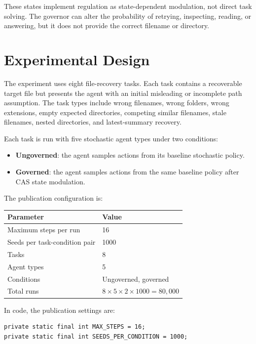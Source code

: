 \documentclass[11pt]{article}
\begin{document}
These states implement regulation as state-dependent modulation, not direct task solving. The governor can alter the probability of retrying, inspecting, reading, or answering, but it does not provide the correct filename or directory.

\section{Experimental Design}

The experiment uses eight file-recovery tasks. Each task contains a recoverable target file but presents the agent with an initial misleading or incomplete path assumption. The task types include wrong filenames, wrong folders, wrong extensions, empty expected directories, competing similar filenames, stale filenames, nested directories, and latest-summary recovery.

Each task is run with five stochastic agent types under two conditions:

\begin{itemize}[leftmargin=1.5em]
    \item \textbf{Ungoverned}: the agent samples actions from its baseline stochastic policy.
    \item \textbf{Governed}: the agent samples actions from the same baseline policy after CAS state modulation.
\end{itemize}

The publication configuration is:

\begin{center}
\begin{tabular}{ll}
\toprule
\textbf{Parameter} & \textbf{Value} \\
\midrule
Maximum steps per run & 16 \\
Seeds per task-condition pair & 1000 \\
Tasks & 8 \\
Agent types & 5 \\
Conditions & Ungoverned, governed \\
Total runs & $8 \times 5 \times 2 \times 1000 = 80{,}000$ \\
\bottomrule
\end{tabular}
\end{center}

In code, the publication settings are:

\begin{verbatim}
private static final int MAX_STEPS = 16;
private static final int SEEDS_PER_CONDITION = 1000;
\end{verbatim}
\end{document}
